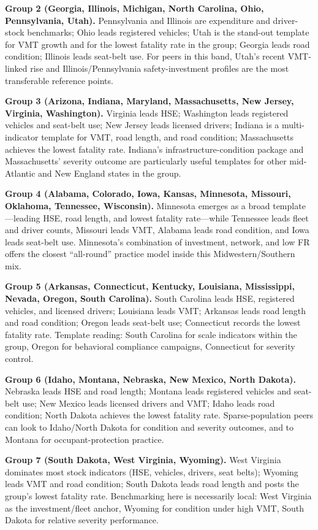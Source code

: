 \documentclass{article}
\begin{document}
\textbf{Group 2 (Georgia, Illinois, Michigan, North Carolina, Ohio, Pennsylvania, Utah).} Pennsylvania and Illinois are expenditure and driver-stock benchmarks; Ohio leads registered vehicles; Utah is the stand-out template for VMT growth and for the lowest fatality rate in the group; Georgia leads road condition; Illinois leads seat-belt use. For peers in this band, Utah's recent VMT-linked rise and Illinois/Pennsylvania safety-investment profiles are the most transferable reference points.

\textbf{Group 3 (Arizona, Indiana, Maryland, Massachusetts, New Jersey, Virginia, Washington).} Virginia leads HSE; Washington leads registered vehicles and seat-belt use; New Jersey leads licensed drivers; Indiana is a multi-indicator template for VMT, road length, and road condition; Massachusetts achieves the lowest fatality rate. Indiana's infrastructure-condition package and Massachusetts' severity outcome are particularly useful templates for other mid-Atlantic and New England states in the group.

\textbf{Group 4 (Alabama, Colorado, Iowa, Kansas, Minnesota, Missouri, Oklahoma, Tennessee, Wisconsin).} Minnesota emerges as a broad template---leading HSE, road length, and lowest fatality rate---while Tennessee leads fleet and driver counts, Missouri leads VMT, Alabama leads road condition, and Iowa leads seat-belt use. Minnesota's combination of investment, network, and low FR offers the closest ``all-round'' practice model inside this Midwestern/Southern mix.

\textbf{Group 5 (Arkansas, Connecticut, Kentucky, Louisiana, Mississippi, Nevada, Oregon, South Carolina).} South Carolina leads HSE, registered vehicles, and licensed drivers; Louisiana leads VMT; Arkansas leads road length and road condition; Oregon leads seat-belt use; Connecticut records the lowest fatality rate. Template reading: South Carolina for scale indicators within the group, Oregon for behavioral compliance campaigns, Connecticut for severity control.

\textbf{Group 6 (Idaho, Montana, Nebraska, New Mexico, North Dakota).} Nebraska leads HSE and road length; Montana leads registered vehicles and seat-belt use; New Mexico leads licensed drivers and VMT; Idaho leads road condition; North Dakota achieves the lowest fatality rate. Sparse-population peers can look to Idaho/North Dakota for condition and severity outcomes, and to Montana for occupant-protection practice.

\textbf{Group 7 (South Dakota, West Virginia, Wyoming).} West Virginia dominates most stock indicators (HSE, vehicles, drivers, seat belts); Wyoming leads VMT and road condition; South Dakota leads road length and posts the group's lowest fatality rate. Benchmarking here is necessarily local: West Virginia as the investment/fleet anchor, Wyoming for condition under high VMT, South Dakota for relative severity performance.
\end{document}
